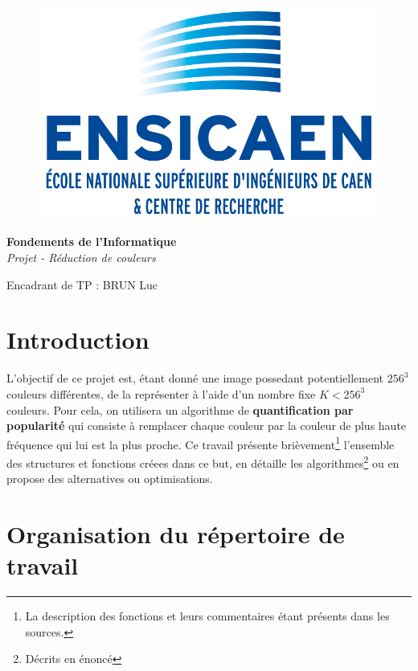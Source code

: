 \documentclass[a4paper,10pt]{article}
\title{}
\author{BENJELLOUN Hicham}
\date{}
\begin{document}
\begin{figure}[!h]
 \centering
 \includegraphics[scale=0.6]{logo.jpg}
\end{figure}

\begin{center}
 {\Large \textbf{Fondements de l'Informatique}} \\
 \textit{Projet - Réduction de couleurs}\\
\end{center}
\noindent
Encadrant de TP : BRUN Luc

\tableofcontents

\section{Introduction}
L'objectif de ce projet est, étant donné une image possedant potentiellement $256^3$ couleurs différentes, de la représenter à l'aide d'un nombre fixe $K<256^3$ couleurs.
Pour cela, on utilisera un algorithme de \textbf{quantification par popularité} qui consiste à remplacer chaque couleur par la couleur de plus haute fréquence qui lui est la plus proche.
\newline
\newline
Ce travail présente brièvement\footnote{La description des fonctions et leurs commentaires étant présents dans les sources.} l'ensemble des structures et fonctions créees dans ce but, en détaille les algorithmes\footnote{Décrits en énoncé} ou en propose des alternatives ou optimisations.
\section{Organisation du répertoire de travail}
\end{document}
